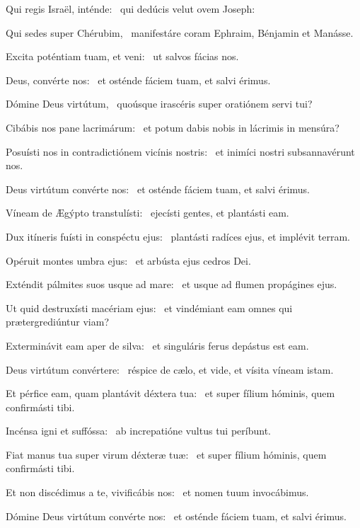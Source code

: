 \item Qui regis Israël, inténde:~\psstar{} qui dedúcis velut ovem Joseph:

\item Qui sedes super Chérubim,~\psstar{} manifestáre coram Ephraim, Bénjamin et Manásse.

\item Excita poténtiam tuam, et veni:~\psstar{} ut salvos fácias nos.

\item Deus, convérte nos:~\psstar{} et osténde fáciem tuam, et salvi érimus.

\item Dómine Deus virtútum,~\psstar{} quoúsque irascéris super oratiónem servi tui?

\item Cibábis nos pane lacrimárum:~\psstar{} et potum dabis nobis in lácrimis in mensúra?

\item Posuísti nos in contradictiónem vicínis nostris:~\psstar{} et inimíci nostri subsannavérunt nos.

\item Deus virtútum convérte nos:~\psstar{} et osténde fáciem tuam, et salvi érimus.

\item Víneam de Ægýpto transtulísti:~\psstar{} ejecísti gentes, et plantásti eam.

\item Dux itíneris fuísti in conspéctu ejus:~\psstar{} plantásti radíces ejus, et implévit terram.

\item Opéruit montes umbra ejus:~\psstar{} et arbústa ejus cedros Dei.

\item Exténdit pálmites suos usque ad mare:~\psstar{} et usque ad flumen propágines ejus.

\item Ut quid destruxísti macériam ejus:~\psstar{} et vindémiant eam omnes qui prætergrediúntur viam?

\item Exterminávit eam aper de silva:~\psstar{} et singuláris ferus depástus est eam.

\item Deus virtútum convértere:~\psstar{} réspice de cælo, et vide, et vísita víneam istam.

\item Et pérfice eam, quam plantávit déxtera tua:~\psstar{} et super fílium hóminis, quem confirmásti tibi.

\item Incénsa igni et suffóssa:~\psstar{} ab increpatióne vultus tui períbunt.

\item Fiat manus tua super virum déxteræ tuæ:~\psstar{} et super fílium hóminis, quem confirmásti tibi.

\item Et non discédimus a te, vivificábis nos:~\psstar{} et nomen tuum invocábimus.

\item Dómine Deus virtútum convérte nos:~\psstar{} et osténde fáciem tuam, et salvi érimus.